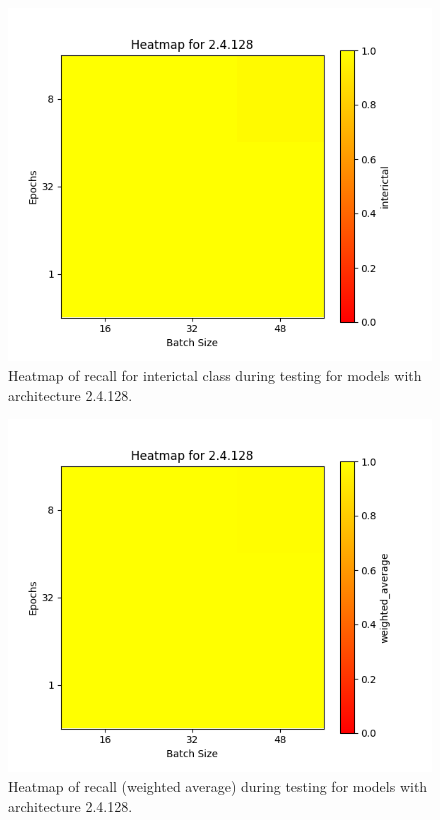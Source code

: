 \documentclass[12pt]{article}
\begin{document}
\begin{figure}[H]
\includegraphics[width=\textwidth]{heatmap_recall_interictal_2.4.128}
\centering
\caption{Heatmap of recall for interictal class during testing for models with architecture 2.4.128.}
\label{fig:time-metrics}
\end{figure}

\begin{figure}[H]
\includegraphics[width=\textwidth]{heatmap_recall_weighted_average_2.4.128}
\centering
\caption{Heatmap of recall (weighted average) during testing for models with architecture 2.4.128.}
\label{fig:time-metrics}
\end{figure}
\end{document}
